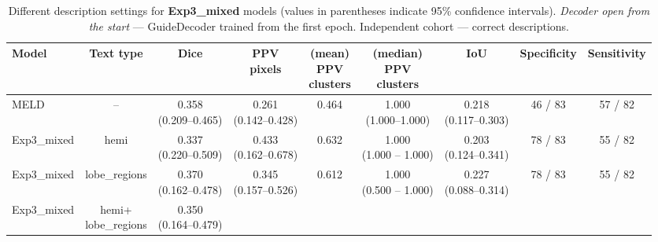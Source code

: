 \documentclass[a4paper,12pt]{article}
\begin{document}
\begin{table}[ht]
\centering
\tiny
\caption{Different description settings for \textbf{Exp3\_mixed} models (values in parentheses indicate 95\% confidence intervals). \emph{Decoder open from the start} — GuideDecoder trained from the first epoch. Independent cohort — correct descriptions.}

\label{tab:independent_cohort_mixed}
\begin{tabular}{lcccccccc}
\textbf{Model} &
\textbf{Text type} &
\textbf{Dice} &
\makecell{\textbf{PPV}\\\textbf{pixels}} &
\makecell{\textbf{(mean)} \\\textbf{PPV} \\\textbf{clusters}} & \makecell{\textbf{(median)} \\\textbf{PPV} \\\textbf{clusters}} & 
\textbf{IoU} & 
\textbf{Specificity} &
\textbf{Sensitivity} \\
\hline
MELD & -- &
\makecell{\colorbox{orange!20}{0.358}\\(0.209--0.465)} &
\makecell{0.261\\(0.142--0.428)} &
0.464 &
\makecell{1.000\\(1.000--1.000)} &
\makecell{\colorbox{orange!20}{0.218}\\(0.117--0.303)} &
46 / 83 & 
\colorbox{green!20}{57 / 82} \\
\hline
Exp3\_mixed & 
hemi &  
\makecell{0.337 \\ (0.220--0.509)} &
\makecell{\colorbox{blue!20}{0.433} \\ (0.162--0.678)} &
\colorbox{blue!20}{0.632} &
\makecell{1.000 \\ (1.000 -- 1.000)} &
\makecell{0.203 \\ (0.124--0.341)} &
78 / 83 & 
\colorbox{orange!20}{55 / 82} \\
\hline
Exp3\_mixed &
lobe\_regions &
\makecell{\colorbox{green!20}{0.370} \\ (0.162--0.478)} &
\makecell{0.345 \\ (0.157--0.526)} &
\colorbox{orange!20}{0.612} &
\makecell{1.000 \\ (0.500 -- 1.000)} &
\makecell{\colorbox{green!20}{0.227} \\ (0.088--0.314)} &
78 / 83 &
\colorbox{orange!20}{55 / 82} \\
\hline
Exp3\_mixed & 
\makecell{hemi+ \\lobe\_regions} &
\makecell{0.350 \\ (0.164--0.479)} &

\end{tabular}
\end{table}
\end{document}
